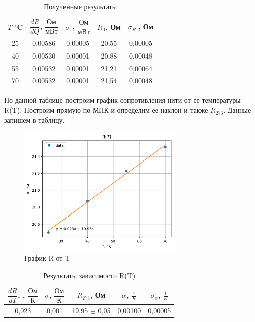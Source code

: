 \documentclass[a4paper,12pt]{article}
\begin{document}
\begin{table}[H]
    \centering
    \begin{tabular}{|c|c|c|c|c|}
    \hline
        $T$ $^\circ$C & $\dfrac{dR}{dQ}$, $\dfrac{Ом}{мВт}$ & $\sigma$ , $\dfrac{Ом}{мВт}$ & $R_0$, Ом & $\sigma_{R_0}$, Ом \\ \hline
        25 & 0,00586 & 0,00005 & 20,55 & 0,00005 \\ \hline
        40 & 0,00530 & 0,00001 & 20,88 & 0,00048 \\ \hline
        55 & 0,00532 & 0,00001 & 21,21 & 0,00064 \\ \hline
        70 & 0,00532 & 0,00001 & 21,54 & 0,00048 \\ \hline
    \end{tabular}
    \caption{Полученные результаты}
\end{table}

По данной таблице построим график сопротивления нити от ее температуры R(T). Построим прямую по МНК и определим ее наклон и также $R_{273}$. Данные запишем в таблицу.

\begin{figure}[H]
    \centering
    \includegraphics[width=0.7\textwidth]{R(T)_new.png}
\caption{График R от T}
\end{figure}

\begin{table}[H]
    \centering
    \begin{tabular}{|c|c|c|c|c|}
    \hline
        $\dfrac{dR}{dT}$, , $\dfrac{Ом}{К}$   & $\sigma$, $\dfrac{Ом}{К}$  & $R_{273}$, Ом  & $\alpha$, $\frac{1}{K}$ & $\sigma_{\alpha}$,  $\frac{1}{K}$ \\ \hline
        0,023 & 0,001 & 19,95 $\pm$ 0,05 & 0,00100 & 0,00005 \\ \hline
    \end{tabular}
    \caption{Результаты зависимости R(T)}
\end{table}
\end{document}
